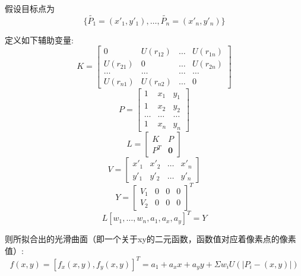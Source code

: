 \documentclass[UTF8]{ctexart}
\begin{document}
假设目标点为$$\{ \tilde{P_1}=(x'_1,y'_1),\dots,\tilde{P_n}=(x'_n,y'_n)\}$$

定义如下辅助变量:
\begin{equation}
    K=\left[
    \begin{matrix}
        0 & U(r_{12}) & \dots & U(r_{1n})\\
        U(r_{21}) & 0 & \dots & U(r_{2n})\\
        \dots & \dots & \dots & \dots \\
        U(r_{n1}) & U(r_{n2}) & \dots & 0
    \end{matrix}    
    \right]
\end{equation}
\begin{equation}
    P=\left[
    \begin{matrix}
        1 & x_1 & y_1 \\
        1 & x_2 & y_2 \\
        \dots & \dots & \dots \\
        1 & x_n & y_n
    \end{matrix}    
    \right]
\end{equation}
\begin{equation}
    L=\left[
    \begin{matrix}
        K & P\\
        P^T & \textbf{0}
    \end{matrix}    
    \right]
\end{equation}
\begin{equation}
    V=\left[
    \begin{matrix}
        x'_1 & x'_2 & \dots & x'_n\\
        y'_1 & y'_2 & \dots & y'_n
    \end{matrix}    
    \right]
\end{equation}
\begin{equation}
    Y=\left[
    \begin{matrix}
        V_1 & 0 & 0 & 0\\
        V_2 & 0 & 0 & 0
    \end{matrix}
    \right]^T
\end{equation}
\begin{equation}
    L\left[
    w_1,\dots,w_n,a_1,a_x,a_y    
    \right]^T = Y
\end{equation}

则所拟合出的光滑曲面（即一个关于xy的二元函数，函数值对应着像素点的像素值）:
\begin{equation}
    f(x,y)=\left[
    f_x(x,y),f_y(x,y)    
    \right]^T
    =a_1+a_xx+a_yy+\Sigma w_iU(|P_i-(x,y)|)
\end{equation}
\end{document}
